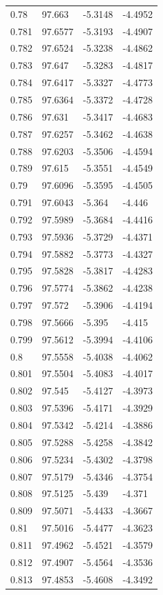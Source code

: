 \begin{tabular}{llll}
0.78 & 97.663 & -5.3148 & -4.4952 \\
0.781 & 97.6577 & -5.3193 & -4.4907 \\
0.782 & 97.6524 & -5.3238 & -4.4862 \\
0.783 & 97.647 & -5.3283 & -4.4817 \\
0.784 & 97.6417 & -5.3327 & -4.4773 \\
0.785 & 97.6364 & -5.3372 & -4.4728 \\
0.786 & 97.631 & -5.3417 & -4.4683 \\
0.787 & 97.6257 & -5.3462 & -4.4638 \\
0.788 & 97.6203 & -5.3506 & -4.4594 \\
0.789 & 97.615 & -5.3551 & -4.4549 \\
0.79 & 97.6096 & -5.3595 & -4.4505 \\
0.791 & 97.6043 & -5.364 & -4.446 \\
0.792 & 97.5989 & -5.3684 & -4.4416 \\
0.793 & 97.5936 & -5.3729 & -4.4371 \\
0.794 & 97.5882 & -5.3773 & -4.4327 \\
0.795 & 97.5828 & -5.3817 & -4.4283 \\
0.796 & 97.5774 & -5.3862 & -4.4238 \\
0.797 & 97.572 & -5.3906 & -4.4194 \\
0.798 & 97.5666 & -5.395 & -4.415 \\
0.799 & 97.5612 & -5.3994 & -4.4106 \\
0.8 & 97.5558 & -5.4038 & -4.4062 \\
0.801 & 97.5504 & -5.4083 & -4.4017 \\
0.802 & 97.545 & -5.4127 & -4.3973 \\
0.803 & 97.5396 & -5.4171 & -4.3929 \\
0.804 & 97.5342 & -5.4214 & -4.3886 \\
0.805 & 97.5288 & -5.4258 & -4.3842 \\
0.806 & 97.5234 & -5.4302 & -4.3798 \\
0.807 & 97.5179 & -5.4346 & -4.3754 \\
0.808 & 97.5125 & -5.439 & -4.371 \\
0.809 & 97.5071 & -5.4433 & -4.3667 \\
0.81 & 97.5016 & -5.4477 & -4.3623 \\
0.811 & 97.4962 & -5.4521 & -4.3579 \\
0.812 & 97.4907 & -5.4564 & -4.3536 \\
0.813 & 97.4853 & -5.4608 & -4.3492 \\

\end{tabular}
